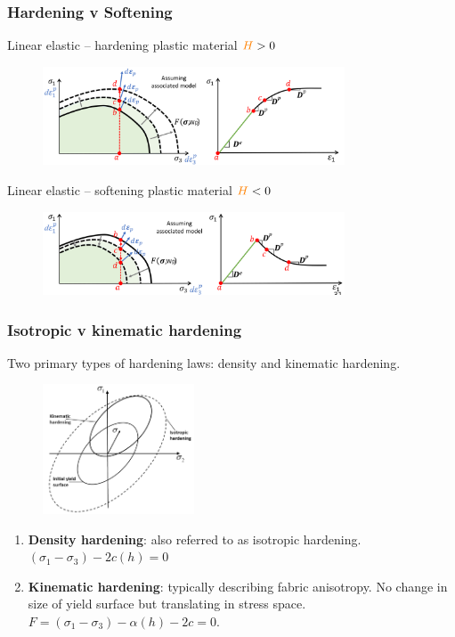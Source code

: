 \documentclass[notes]{beamer}
\begin{document}
\begin{frame}
\frametitle{Hardening v Softening}
Linear elastic – hardening plastic material  $\textcolor{orange}{H} > 0$
\begin{figure}
	\includegraphics[width=0.8\textwidth]{figs/hardening-plastic.png}
\end{figure}
Linear elastic – softening plastic material  $\textcolor{orange}{H} < 0$
\begin{figure}
	\includegraphics[width=0.8\textwidth]{figs/softening-plastic.png}
\end{figure}
\end{frame}

\begin{frame}
\frametitle{Isotropic v kinematic hardening}
Two primary types of hardening laws: density and kinematic hardening.
\begin{figure}
	\includegraphics[width=0.4\textwidth]{figs/isotropic-kinematic-hardening.png}
\end{figure}
\begin{enumerate}
	\item \textbf{Density hardening}: also referred to as isotropic hardening. $(\sigma_1 - \sigma_3) - 2c(h) = 0$
	\item \textbf{Kinematic hardening}: typically describing fabric anisotropy. No change in size of yield surface but translating in stress space. $F = (\sigma_1 - \sigma_3) - \alpha(h) - 2c = 0$.
\end{enumerate}
\end{frame}
\end{document}
